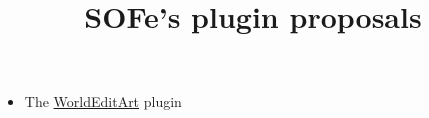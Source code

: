 \documentclass{article}
\title{SOFe's plugin proposals}
\begin{document}
	\maketitle
	\begin{itemize}
		\item The \href{run:./WorldEditArt}{WorldEditArt} plugin
	\end{itemize}
\end{document}
